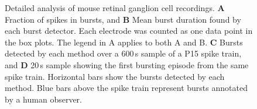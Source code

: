 \documentclass[12pt, titlepage]{article}
\begin{document}
		\begin{figure}[h]
			\centering
			\caption{Detailed analysis of mouse retinal ganglion cell recordings. \textbf{A} Fraction of spikes in bursts, and \textbf{B} Mean burst duration found by each burst detector. Each electrode was counted as one data point in the box plots. The legend in A applies to both A and B. \textbf{C} Bursts detected by each method over a 600$\,$s sample of a P15 spike train, and \textbf{D} 20$\,$s sample showing the first bursting episode from the same spike train. Horizontal bars show the bursts detected by each method. Blue bars above the spike train represent bursts annotated by a human observer.  }
			\label{RGC_results}
		\end{figure}
\end{document}
